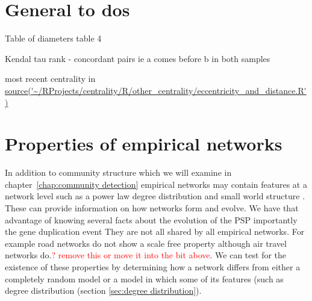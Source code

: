 \section{General to dos}

Table of diameters \cite{crescenzi2013computing}
 table 4 

Kendal tau rank - concordant pairs ie a comes before b in both samples 

most recent centrality in \url{source('~/RProjects/centrality/R/other_centrality/eccentricity_and_distance.R')}



\section{Properties of empirical networks}
\label{sec:Properties of empirical networks}
In addition to community structure which we will examine in chapter~\ref{chap:community detection} empirical networks may contain features at a network level such as a power law degree distribution \cite{barabasi1999emergence} \cite{barabasi1999mean} and small world structure \cite{watts1998collective}. These can provide information on how networks form and evolve. We have that advantage of knowing several facts about the evolution of the PSP importantly the gene duplication event \cite{grant2016molecular} They are not all shared by all empirical networks. For example road networks do not show a scale free property although air travel networks do.\textcolor{red}{? remove this or move it into the bit above}. We can test for the existence of these properties by determining how a network differs from either a completely random model or a model in which some of its features (such as degree distribution (section \ref{sec:degree distribution}).

